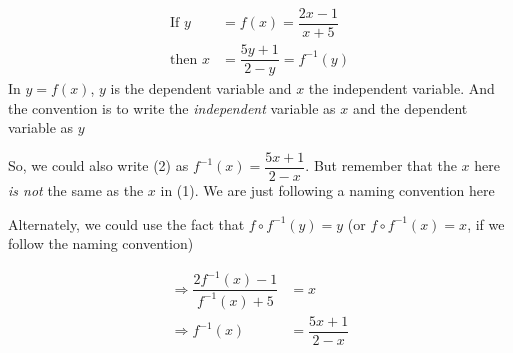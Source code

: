 \begin{solution}[\mcq]
	\begin{align}
		\text{If } y &= f(x) = \dfrac{2x-1}{x+5} \\
		\text{then } x &= \dfrac{5y+1}{2-y} = f^{-1}(y)
	\end{align}
	In $y = f(x)$, $y$ is the dependent variable and $x$ the independent variable. 
	And the convention is to write the \textit{independent} variable as $x$ and the 
	dependent variable as $y$
	
	So, we could also write (2) as $f^{-1}(x) = \dfrac{5x+1}{2-x}$. But remember that 
	the $x$ here \textit{is not} the same as the $x$ in (1). We are just following a naming
	convention here
	
	Alternately, we could use the fact that $f \circ f^{-1}(y) = y$ (or $f \circ f^{-1}(x) = x$, if 
	we follow the naming convention)
	
	\begin{align}
		\Rightarrow \dfrac{2f^{-1}(x)-1}{f^{-1}(x)+5} &= x \\
		\Rightarrow f^{-1}(x) &= \dfrac{5x+1}{2-x}
	\end{align}
\end{solution}
